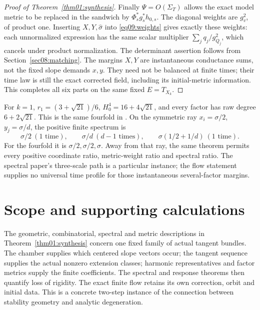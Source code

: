 \documentclass[11pt]{amsart}
\theoremstyle{definition}
\theoremstyle{remark}
\begin{document}
\begin{proof}[Proof of Theorem~\ref{thm01:synthesis}]
Finally \(\Psi=O(\Sigma_T)\) allows the exact model metric to be
replaced in the sandwich by \(\Phi_s^*g_s^*h_{0,s}\). The diagonal
weights are \(g_v^2\), of product one. Inserting \(X,Y,\widehat
\sigma\) into \eqref{eq09:weights} gives exactly these weights:
each unnormalized expression has the same scalar multiplier
\(\sum_jq_j/g_{Q_j}^2\), which cancels under product normalization.
The determinant assertion follows from Section~\ref{sec08:matching}.
The margins \(X,Y\) are instantaneous conductance sums, not the
fixed slope demands \(x,y\). They need not be balanced at finite
times; their time law is still the exact corrected field, including
its initial-metric information. This completes all six parts on
the same fixed \(E=T_{X_k}\).
\end{proof}

\enlargethispage{-\baselineskip}
For \(k=1\), \(r_1=(3+\sqrt{21})/6\),
\(H_0^4=16+4\sqrt{21}\), and every factor has raw degree
\(6+2\sqrt{21}\). This is the same fourfold in
\cite[\S7]{wuebben2026uniform}. On the symmetric ray
\(x_i=\sigma/2\), \(y_j=\sigma/d\), the positive finite
spectrum is
\[
 \sigma/2\ (1\text{ time}),\qquad
 \sigma/d\ (d-1\text{ times}),\qquad
 \sigma(1/2+1/d)\ (1\text{ time}).
\]
For the fourfold it is \(\sigma/2,\sigma/2,\sigma\).
Away from that ray, the same theorem permits every positive
coordinate ratio, metric-weight ratio and spectral ratio.
The spectral paper's three-scale path is a particular instance;
the flow statement supplies no universal time profile for those
instantaneous several-factor margins.

\section{Scope and supporting calculations}\label{sec10:scope}

The geometric, combinatorial, spectral and metric descriptions in
Theorem~\ref{thm01:synthesis} concern one fixed family of actual
tangent bundles. The chamber supplies which centered slope vectors
occur; the tangent sequence supplies the actual nonzero extension
classes; harmonic representatives and factor metrics supply the
finite coefficients. The spectral and response theorems then quantify
loss of rigidity. The exact finite flow retains its own correction,
orbit and initial data. This is a concrete two-step instance of the
connection between stability geometry and analytic degeneration.
\end{document}
